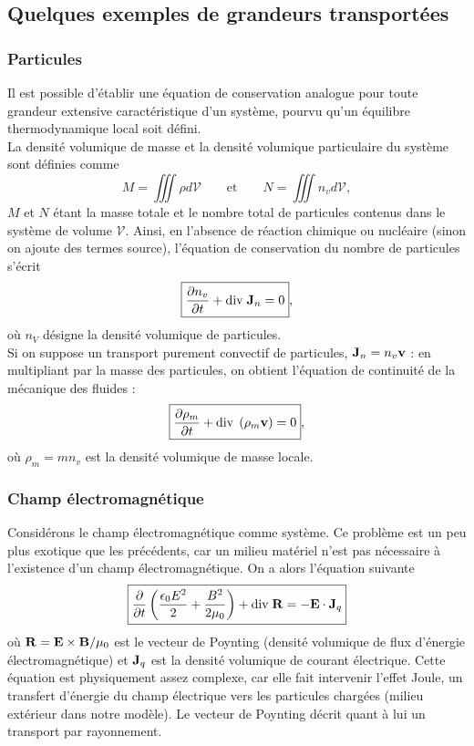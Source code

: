 \documentclass[11pt,a4paper]{report}
\begin{document}
\subsection{Quelques exemples de grandeurs transportées}

\subsubsection{Particules}

Il est possible d'établir une équation de conservation analogue pour toute grandeur extensive caractéristique d'un système, pourvu qu'un équilibre thermodynamique local soit défini.\\ 

La densité volumique de masse et la densité volumique particulaire du système sont définies comme
\begin{equation}
	M = \iiint \rho d\mathcal{V} \qquad\text{et}\qquad N = \iiint n_v d\mathcal{V},
\end{equation}
$M$ et $N$ étant la masse totale et le nombre total de particules contenus dans le système de volume $\mathcal{V}$. Ainsi, en l'absence de réaction chimique ou nucléaire (sinon on ajoute des termes source), l'équation de conservation du nombre de particules s'écrit
\begin{equation}
	\boxed{\frac{\partial n_v}{\partial t} + \text{div}\;\bold{J}_n = 0},
\end{equation}
où $n_V$ désigne la densité volumique de particules.\\

Si on suppose un transport purement convectif de particules, $\bold{J}_n = n_v \bold{v}$ : en multipliant par la masse des particules, on obtient l'équation de continuité de la mécanique des fluides :
\begin{equation}
	\boxed{\frac{\partial \rho_m}{\partial t} + \text{div}\;\left(\rho_m \bold{v}\right) = 0},
\end{equation}
où $\rho_m = m n_v$ est la densité volumique de masse locale.

\subsubsection{Champ électromagnétique}

Considérons le champ électromagnétique comme système. Ce problème est un peu plus exotique que les précédents, car un milieu matériel n'est pas nécessaire à l'existence d'un champ électromagnétique. On a alors l'équation suivante
\begin{equation}
	\boxed{\frac{\partial}{\partial t} \left( \frac{\epsilon_0 E^2}{2} + \frac{B^2}{2\mu_0}\right)
	+ \text{div}\;\bold{R}
	= - \bold{E}\cdot\bold{J}_q}
\end{equation}
où $\bold{R} = \bold{E}\times\bold{B}/\mu_0$ est le vecteur de Poynting (densité volumique de flux d'énergie électromagnétique) et $\bold{J}_q$ est la densité volumique de courant électrique. Cette équation est physiquement assez complexe, car elle fait intervenir l'effet Joule, un transfert d'énergie du champ électrique vers les particules chargées (milieu extérieur dans notre modèle). Le vecteur de Poynting décrit quant à lui un transport par rayonnement.
\end{document}
